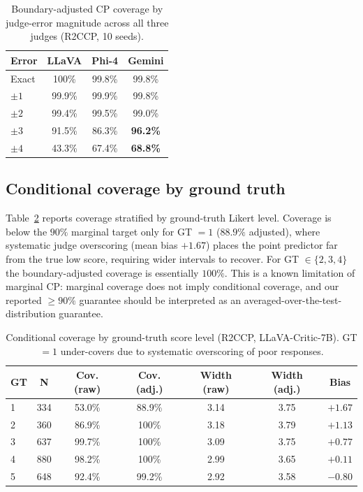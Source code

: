 \documentclass{article}
\begin{document}
\begin{table}[t]
\centering
\caption{Boundary-adjusted CP coverage by judge-error magnitude across all three judges (R2CCP, 10 seeds).}
\label{tab:error_bins_all}
\small
\begin{tabular}{lccc}
\toprule
\textbf{Error} & \textbf{LLaVA} & \textbf{Phi-4} & \textbf{Gemini} \\
\midrule
Exact & 100\% & 99.8\% & 99.8\% \\
$\pm 1$ & 99.9\% & 99.9\% & 99.8\% \\
$\pm 2$ & 99.4\% & 99.5\% & 99.0\% \\
$\pm 3$ & 91.5\% & 86.3\% & \textbf{96.2\%} \\
$\pm 4$ & 43.3\% & 67.4\% & \textbf{68.8\%} \\
\bottomrule
\end{tabular}
\end{table}

\subsection{Conditional coverage by ground truth}
\label{app:conditional}

Table~\ref{tab:conditional} reports coverage stratified by ground-truth Likert level. Coverage is below the $90\%$ marginal target only for GT $= 1$ ($88.9\%$ adjusted), where systematic judge overscoring (mean bias $+1.67$) places the point predictor far from the true low score, requiring wider intervals to recover. For GT $\in \{2, 3, 4\}$ the boundary-adjusted coverage is essentially $100\%$. This is a known limitation of marginal CP: marginal coverage does not imply conditional coverage, and our reported $\geq 90\%$ guarantee should be interpreted as an averaged-over-the-test-distribution guarantee.

\begin{table}[t]
\centering
\caption{Conditional coverage by ground-truth score level (R2CCP, LLaVA-Critic-7B). GT $=1$ under-covers due to systematic overscoring of poor responses.}
\label{tab:conditional}
\small
\begin{tabular}{lcccccc}
\toprule
\textbf{GT} & \textbf{N} & \textbf{Cov. (raw)} & \textbf{Cov. (adj.)} & \textbf{Width (raw)} & \textbf{Width (adj.)} & \textbf{Bias} \\
\midrule
1 & 334 & 53.0\% & 88.9\% & 3.14 & 3.75 & $+1.67$ \\
2 & 360 & 86.9\% & 100\% & 3.18 & 3.79 & $+1.13$ \\
3 & 637 & 99.7\% & 100\% & 3.09 & 3.75 & $+0.77$ \\
4 & 880 & 98.2\% & 100\% & 2.99 & 3.65 & $+0.11$ \\
5 & 648 & 92.4\% & 99.2\% & 2.92 & 3.58 & $-0.80$ \\
\bottomrule
\end{tabular}
\end{table}
\end{document}
